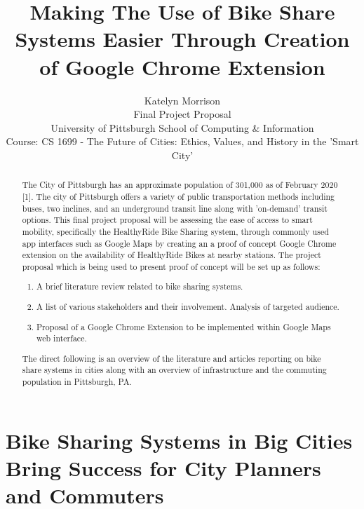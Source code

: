 \documentclass[letterpaper, 12 pt, conference]{ieeeconf}  %
\title{\LARGE \bf
Making The Use of Bike Share Systems Easier Through Creation of Google Chrome Extension
}
\author{Katelyn Morrison \\%
Final Project Proposal\\
University of Pittsburgh School of Computing \& Information \\
Course: CS 1699 - The Future of Cities: Ethics, Values, and History in the 'Smart City' 
}
\begin{document}
\maketitle
\thispagestyle{empty}
\pagestyle{empty}


\begin{abstract}

The City of Pittsburgh has an approximate population of 301,000 as of February 2020 [1]. The city of Pittsburgh offers a variety of public transportation methods including buses, two inclines, and an underground transit line along with 'on-demand' transit options. This final project proposal will be assessing the ease of access to smart mobility, specifically the HealthyRide Bike Sharing system, through commonly used app interfaces such as Google Maps by creating an a proof of concept Google Chrome extension on the availability of HealthyRide Bikes at nearby stations. The project proposal which is being used to present proof of concept will be set up as follows:
\begin{enumerate}
  \item A brief literature review related to bike sharing systems.
  \item A list of various stakeholders and their involvement. Analysis of targeted audience.
  \item Proposal of a Google Chrome Extension to be implemented within Google Maps web interface.
\end{enumerate}
The direct following is an overview of the literature and articles reporting on bike share systems in cities along with an overview of infrastructure and the commuting population in Pittsburgh, PA.
\end{abstract}

\section{Bike Sharing Systems in Big Cities Bring Success for City Planners and Commuters}
\end{document}
